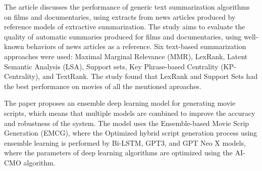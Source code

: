 \documentclass[fleqn,moreauthors,10pt]{ds_report}
\begin{document}
The article \cite{APARICIO20167} discusses the performance of generic text summarization algorithms on films and documentaries, using extracts from news articles produced by reference models of extractive summarization. The study aims to evaluate the quality of automatic summaries produced for films and documentaries, using well-known behaviors of news articles as a reference. Six text-based summarization approaches were used: Maximal Marginal Relevance (MMR), LexRank, Latent Semantic Analysis (LSA), Support sets, Key Phrase-based Centrality (KP-Centrality), and TextRank. The study found that LexRank and Support Sets had the best performance on movies of all the mentioned aproaches.

The paper \cite{DHARANIYA2023102150} proposes an ensemble deep learning model for generating movie scripts, which means that multiple models are combined to improve the accuracy and robustness of the system.  The model uses the Ensemble-based Movie Scrip Generation (EMCG), where the Optimized hybrid script generation process using ensemble learning is performed by Bi-LSTM, GPT3, and GPT Neo X models, where the parameters of deep learning algorithms are optimized using the AI-CMO algorithm.





\end{document}
